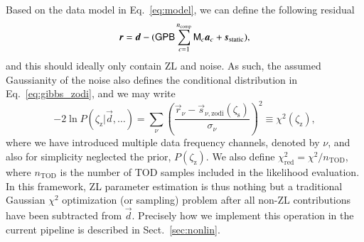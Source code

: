 \documentclass[twocolumn]{aa}
\newcommand{\dv}[0]{\vec{d}}
\newcommand{\B}[0]{\tens{B}}
\renewcommand{\G}[0]{\tens{G}}
\newcommand{\s}[0]{\vec{s}}
\renewcommand{\a}[0]{\vec{a}}
\newcommand{\M}[0]{\tens{M}}
\renewcommand{\r}[0]{\vec{r}}
\renewcommand{\P}[0]{\tens{P}}
\begin{document}
Based on the data model in Eq.~\eqref{eq:model}, we can define the
following residual
\begin{equation}
\r = \dv - (\G\P\B\sum_{c=1}^{n_{\mathrm{comp}}}\M_c\a_c +
          \s_{\mathrm{static}}),
\end{equation}
and this should ideally only contain ZL and noise. As such, the
assumed Gaussianity of the noise also defines the conditional
distribution in Eq.~\eqref{eq:gibbs_zodi}, and we may write
\begin{equation}
  -2\ln P(\zeta_{\mathrm{z}}|\dv, \ldots) = \sum_{\nu}
  \left(\frac{\r_{\nu} -
    \s_{\nu,\mathrm{zodi}}(\zeta_\mathrm{s})}{\sigma_{\nu}}\right)^2 \equiv
  \chi^2 (\zeta_{\mathrm{z}}),
  \label{eq:gibbs_chisq}
\end{equation}
where we have introduced multiple data frequency channels, denoted by
$\nu$, and also for simplicity neglected the prior,
$P(\zeta_{\mathrm{z}})$. We also define
$\chi^2_{\mathrm{red}}=\chi^2/n_{\mathrm{TOD}}$, where
$n_{\mathrm{TOD}}$ is the number of TOD samples included in the
likelihood evaluation. In this framework, ZL parameter estimation is
thus nothing but a traditional Gaussian $\chi^2$ optimization (or
sampling) problem after all non-ZL contributions have been subtracted
from $\dv$. Precisely how we implement this operation in the
current pipeline is described in Sect.~\ref{sec:nonlin}.
\end{document}
